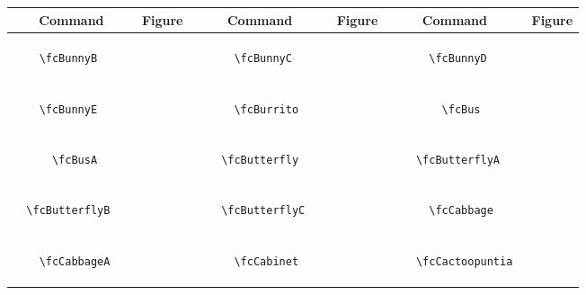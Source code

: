 \documentclass[x11names]{article}
\begin{document}
\begin{table}[H]\centering\begin{tabular}{|c|c|c|c|c|c|}\hline{\bf Command} & {\bf Figure} & {\bf Command} & {\bf Figure} & {\bf Command} & {\bf Figure}\\	\hline	&\multirow{5}{*}{	\fcBunnyB	[scale=0.16]} & &\multirow{5}{*}{	\fcBunnyC	[scale=0.16]} & &\multirow{5}{*}{	\fcBunnyD	[scale=0.16]}\\	& & & & & \\	& & & & & \\	\verb|	\fcBunnyB	| & & \verb|	\fcBunnyC	| & & \verb|	\fcBunnyD	| & \\	& & & & & \\	& & & & & \\	& & & & & \\	\hline									
		&\multirow{5}{*}{	\fcBunnyE	[scale=0.16]} & &\multirow{5}{*}{	\fcBurrito	[scale=0.16]} & &\multirow{5}{*}{	\fcBus	[scale=0.16]}\\	& & & & & \\	& & & & & \\	\verb|	\fcBunnyE	| & & \verb|	\fcBurrito	| & & \verb|	\fcBus	| & \\	& & & & & \\	& & & & & \\	& & & & & \\	\hline									
		&\multirow{5}{*}{	\fcBusA	[scale=0.16]} & &\multirow{5}{*}{	\fcButterfly	[scale=0.64]} & &\multirow{5}{*}{	\fcButterflyA	[scale=0.16]}\\	& & & & & \\	& & & & & \\	\verb|	\fcBusA	| & & \verb|	\fcButterfly	| & & \verb|	\fcButterflyA	| & \\	& & & & & \\	& & & & & \\	& & & & & \\	\hline									
		&\multirow{5}{*}{	\fcButterflyB	[scale=0.64]} & &\multirow{5}{*}{	\fcButterflyC	[scale=0.16]} & &\multirow{5}{*}{	\fcCabbage	[scale=0.16]}\\	& & & & & \\	& & & & & \\	\verb|	\fcButterflyB	| & & \verb|	\fcButterflyC	| & & \verb|	\fcCabbage	| & \\	& & & & & \\	& & & & & \\	& & & & & \\	\hline									
		&\multirow{5}{*}{	\fcCabbageA	[scale=0.16]} & &\multirow{5}{*}{	\fcCabinet	[scale=0.16]} & &\multirow{5}{*}{	\fcCactoopuntia	[scale=0.16]}\\	& & & & & \\	& & & & & \\	\verb|	\fcCabbageA	| & & \verb|	\fcCabinet	| & & \verb|	\fcCactoopuntia	| & \\	& & & & & \\	& & & & & \\	& & & & & \\	\hline									

\end{tabular}
\end{table}
\end{document}
